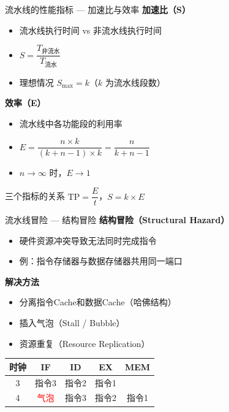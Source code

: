 \documentclass[10pt, aspectratio=169]{beamer}
\begin{document}
\begin{frame}{流水线的性能指标 --- 加速比与效率}
    \textbf{加速比（S）}
    \begin{itemize}
        \item 流水线执行时间 vs 非流水线执行时间
        \item $S = \dfrac{T_{\text{非流水}}}{T_{\text{流水}}}$
        \item 理想情况 $S_{\max} = k$（$k$ 为流水线段数）
    \end{itemize}
    \vspace{0.3em}
    \textbf{效率（E）}
    \begin{itemize}
        \item 流水线中各功能段的利用率
        \item $E = \dfrac{n \times k}{(k + n - 1) \times k} = \dfrac{n}{k + n - 1}$
        \item $n \rightarrow \infty$ 时，$E \rightarrow 1$
    \end{itemize}
    \vspace{0.3em}
    \begin{block}{三个指标的关系}
        $\text{TP} = \dfrac{E}{t}$，$S = k \times E$
    \end{block}
\end{frame}

\begin{frame}{流水线冒险 --- 结构冒险}
    \textbf{结构冒险（Structural Hazard）}
    \begin{itemize}
        \item 硬件资源冲突导致无法同时完成指令
        \item 例：指令存储器与数据存储器共用同一端口
    \end{itemize}
    \vspace{0.3em}
    \textbf{解决方法}
    \begin{itemize}
        \item 分离指令Cache和数据Cache（哈佛结构）
        \item 插入气泡（Stall / Bubble）
        \item 资源重复（Resource Replication）
    \end{itemize}
    \vspace{0.3em}
    \begin{center}
        \begin{tabular}{|c|c|c|c|c|}
            \hline
            时钟 & IF & ID & EX & MEM \\
            \hline
            3 & 指令3 & 指令2 & 指令1 &  \\
            4 & \textcolor{red}{气泡} & 指令3 & 指令2 & 指令1 \\
            \hline
        \end{tabular}
    \end{center}
\end{frame}
\end{document}
